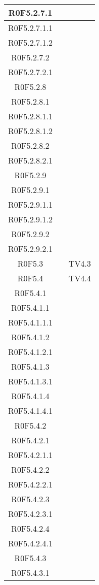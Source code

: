 \begin{center}
\begin{longtable}{|c|c|c|}
\hline
R0F5.2.7.1 &  &  \\
\hline
R0F5.2.7.1.1 &  &  \\
\hline
R0F5.2.7.1.2 &  &  \\
\hline
R0F5.2.7.2 &  &  \\
\hline
R0F5.2.7.2.1 &  &  \\
\hline
R0F5.2.8 &  &  \\
\hline
R0F5.2.8.1 &  &  \\
\hline
R0F5.2.8.1.1 &  &  \\
\hline
R0F5.2.8.1.2 &  &  \\
\hline
R0F5.2.8.2 &  &  \\
\hline
R0F5.2.8.2.1 &  &  \\
\hline
R0F5.2.9 &  &  \\
\hline
R0F5.2.9.1 &  &  \\
\hline
R0F5.2.9.1.1 &  &  \\
\hline
R0F5.2.9.1.2 &  &  \\
\hline
R0F5.2.9.2 &  &  \\
\hline
R0F5.2.9.2.1 &  &  \\
\hline
R0F5.3 &  & TV4.3 \\
\hline
R0F5.4 &  & TV4.4 \\
\hline
R0F5.4.1 &  &  \\
\hline
R0F5.4.1.1 &  &  \\
\hline
R0F5.4.1.1.1 &  &  \\
\hline
R0F5.4.1.2 &  &  \\
\hline
R0F5.4.1.2.1 &  &  \\
\hline
R0F5.4.1.3 &  &  \\
\hline
R0F5.4.1.3.1 &  &  \\
\hline
R0F5.4.1.4 &  &  \\
\hline
R0F5.4.1.4.1 &  &  \\
\hline
R0F5.4.2 &  &  \\
\hline
R0F5.4.2.1 &  &  \\
\hline
R0F5.4.2.1.1 &  &  \\
\hline
R0F5.4.2.2 &  &  \\
\hline
R0F5.4.2.2.1 &  &  \\
\hline
R0F5.4.2.3 &  &  \\
\hline
R0F5.4.2.3.1 &  &  \\
\hline
R0F5.4.2.4 &  &  \\
\hline
R0F5.4.2.4.1 &  &  \\
\hline
R0F5.4.3 &  &  \\
\hline
R0F5.4.3.1 &  &  \\

\end{longtable}
\end{center}
